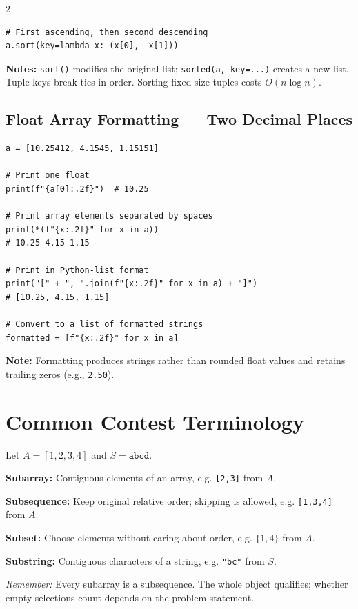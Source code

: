 \documentclass[9pt,a4paper]{extarticle}
\newcommand{\code}[1]{\texttt{#1}}
\begin{document}
\begin{multicols}{2}
\begin{lstlisting}
# First ascending, then second descending
a.sort(key=lambda x: (x[0], -x[1]))
\end{lstlisting}
\textbf{Notes:} \code{sort()} modifies the original list;
\code{sorted(a, key=...)} creates a new list. Tuple keys
break ties in order. Sorting fixed-size tuples costs
$O(n\log n)$.

\par\noindent\begin{minipage}[t]{\linewidth}
\subsection{Float Array Formatting --- Two Decimal Places}
\begin{lstlisting}
a = [10.25412, 4.1545, 1.15151]

# Print one float
print(f"{a[0]:.2f}")  # 10.25

# Print array elements separated by spaces
print(*(f"{x:.2f}" for x in a))
# 10.25 4.15 1.15

# Print in Python-list format
print("[" + ", ".join(f"{x:.2f}" for x in a) + "]")
# [10.25, 4.15, 1.15]

# Convert to a list of formatted strings
formatted = [f"{x:.2f}" for x in a]
\end{lstlisting}
\textbf{Note:} Formatting produces strings rather than
rounded float values and retains trailing zeros
(e.g., \code{2.50}).
\end{minipage}\par
\section{Common Contest Terminology}

Let $A=[1,2,3,4]$ and $S=\texttt{abcd}$.

\textbf{Subarray:} Contiguous elements of an array, e.g. \code{[2,3]} from $A$.\par
\textbf{Subsequence:} Keep original relative order; skipping is allowed, e.g. \code{[1,3,4]} from $A$.\par
\textbf{Subset:} Choose elements without caring about order, e.g. $\{1,4\}$ from $A$.\par
\textbf{Substring:} Contiguous characters of a string, e.g. \code{"bc"} from $S$.\par

\textit{Remember:} Every subarray is a subsequence. The whole object qualifies; whether empty selections count depends on the problem statement.


\end{multicols}
\end{document}
